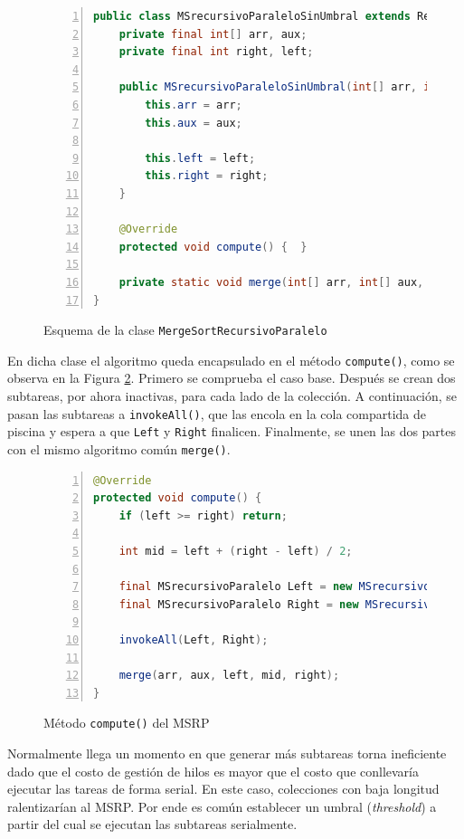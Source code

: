 \documentclass[titlepage]{article}
\begin{document}
\begin{figure}[h]
	\begin{lstlisting}[language=java, frame=single, numbers=left]
public class MSrecursivoParaleloSinUmbral extends RecursiveAction {
	private final int[] arr, aux;
	private final int right, left;
	
	public MSrecursivoParaleloSinUmbral(int[] arr, int[] aux, int left, int right) {
		this.arr = arr;
		this.aux = aux;
		
		this.left = left;
		this.right = right;
	}
	
	@Override
	protected void compute() {	}
	
	private static void merge(int[] arr, int[] aux, int left, int mid, int right) {	}	
}    	
	\end{lstlisting}
	\caption{Esquema de la clase \lstinline{MergeSortRecursivoParalelo}}
	\label{fig:MSRP_RecursiveAction}
\end{figure}

En dicha clase el algoritmo queda encapsulado en el método  \lstinline|compute()|, como se observa en la Figura \ref{fig:MSRP_Compute}. Primero se comprueba el caso base. Después se crean dos subtareas, por ahora inactivas, para cada lado de la colección. A continuación, se pasan las subtareas a \lstinline|invokeAll()|, que las encola en la cola compartida de piscina y espera a que \lstinline|Left| y \lstinline|Right| finalicen. Finalmente, se unen las dos partes con el mismo algoritmo común \lstinline|merge()|.

\begin{figure}[h]
    \begin{lstlisting}[language=java, frame=single, numbers=left]
@Override
protected void compute() {
	if (left >= right) return;
	
	int mid = left + (right - left) / 2;
	
	final MSrecursivoParalelo Left = new MSrecursivoParalelo(arr, aux, left, mid);
	final MSrecursivoParalelo Right = new MSrecursivoParalelo(arr, aux, mid + 1, right);
	
	invokeAll(Left, Right);
	
	merge(arr, aux, left, mid, right);
}
    \end{lstlisting}
    \caption{Método \lstinline{compute()} del MSRP}
    \label{fig:MSRP_Compute}
\end{figure}

Normalmente llega un momento en que generar más subtareas torna ineficiente dado que el costo de gestión de hilos es mayor que el costo que conllevaría ejecutar las tareas de forma serial. En este caso, colecciones con baja longitud ralentizarían al MSRP. Por ende es común establecer un umbral (\textit{threshold}) a partir del cual se ejecutan las subtareas serialmente.
\end{document}
